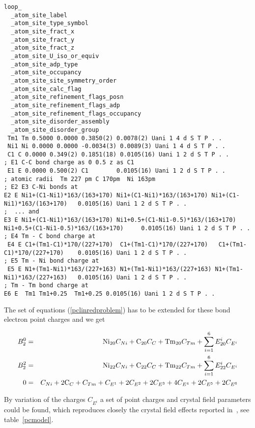 \begin{verbatim}
loop_
  _atom_site_label
  _atom_site_type_symbol
  _atom_site_fract_x
  _atom_site_fract_y
  _atom_site_fract_z
  _atom_site_U_iso_or_equiv
  _atom_site_adp_type
  _atom_site_occupancy
  _atom_site_site_symmetry_order
  _atom_site_calc_flag
  _atom_site_refinement_flags_posn
  _atom_site_refinement_flags_adp
  _atom_site_refinement_flags_occupancy
  _atom_site_disorder_assembly
  _atom_site_disorder_group
 Tm1 Tm 0.5000 0.0000 0.3850(2) 0.0078(2) Uani 1 4 d S T P . .
 Ni1 Ni 0.0000 0.0000 -0.0034(3) 0.0089(3) Uani 1 4 d S T P . .
 C1 C 0.0000 0.349(2) 0.1851(18) 0.0105(16) Uani 1 2 d S T P . .
; E1 C-C bond charge as 0 0.5 z as C1
 E1 E 0.0000 0.500(2) C1        0.0105(16) Uani 1 2 d S T P . .
; atomic radii  Tm 227 pm C 170pm  Ni 163pm
; E2 E3 C-Ni bonds at 
E2 E Ni1+(C1-Ni1)*163/(163+170) Ni1+(C1-Ni1)*163/(163+170) Ni1+(C1-Ni1)*163/(163+170)   0.0105(16) Uani 1 2 d S T P . .
;  ... and
E3 E Ni1+(C1-Ni1)*163/(163+170) Ni1+0.5+(C1-Ni1-0.5)*163/(163+170) Ni1+0.5+(C1-Ni1-0.5)*163/(163+170)	  0.0105(16) Uani 1 2 d S T P . .
; E4 Tm - C bond charge at
 E4 E C1+(Tm1-C1)*170/(227+170)  C1+(Tm1-C1)*170/(227+170)   C1+(Tm1-C1)*170/(227+170)    0.0105(16) Uani 1 2 d S T P . .
; E5 Tm - Ni bond charge at
 E5 E N1+(Tm1-Ni1)*163/(227+163) N1+(Tm1-Ni1)*163/(227+163) N1+(Tm1-Ni1)*163/(227+163)   0.0105(16) Uani 1 2 d S T P . .
; Tm - Tm bond charge at
E6 E  Tm1 Tm1+0.25  Tm1+0.25 0.0105(16) Uani 1 2 d S T P . .
\end{verbatim}



The set of equations (\ref{pclinredproblem}) has to be extended for these bond electron point charges and
we get

\begin{eqnarray}\label{pclinproblem}
B_2^0 &=& {\rm Ni}_{20} C_{Ni}+{\rm C}_{20} C_{C}+{\rm Tm}_{20} C_{Tm}+\sum_{i=1}^6 E^i_{20} C_{E^i} \nonumber \\
B_2^2 &=& {\rm Ni}_{22} C_{Ni}+{\rm C}_{22} C_{C}+{\rm Tm}_{22} C_{Tm} +\sum_{i=1}^6 E^i_{22} C_{E^i} \nonumber \\
0 &=& C_{Ni}+2 {\rm C}_{C}+ C_{Tm} +C_{E^1}+2C_{E^2}+2C_{E^3}+4C_{E^4}+2C_{E^5}+2C_{E^6}
\end{eqnarray}


By variation of the charges $C_{E^i}$ a set of point charges and crystal field parameters
could be found, which reproduces closely the crystal field effects reported in~\cite{roman23-125137}, see
table~\ref{pcmodel}.

